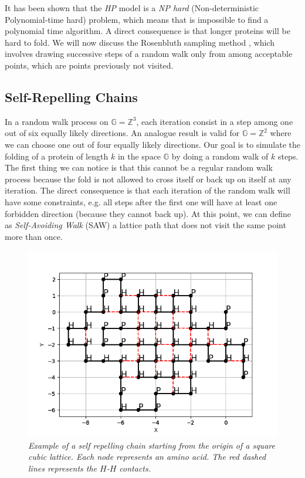 It has been shown that the \emph{HP} model is a \emph{NP hard} (Non-deterministic Polynomial-time hard) problem, which means that is impossible to find a polynomial time algorithm.
A direct consequence is that longer proteins will be hard to fold.
We will now discuss the Rosenbluth sampling method \cite{PERM}, which involves drawing successive steps of a random walk only from among acceptable points, which are points previously not visited.

\subsection{Self-Repelling Chains}
In a random walk process on $\mathbb{G} = \mathbb{Z}^3$, each iteration consist in a step among one out of six equally likely directions.
An analogue result is valid for $\mathbb{G} = \mathbb{Z}^2$ where we can choose one out of four equally likely directions.
Our goal is to simulate the folding of a protein of length $k$ in the space $\mathbb{G}$ by doing a random walk of $k$ steps.
The first thing we can notice is that this cannot be a regular random walk process because the fold is not allowed to cross itself or back up on itself at any iteration.
The direct consequence is that each iteration of the random walk will have some constraints, e.g. all steps after the first one will have at least one forbidden direction (because they cannot back up).
At this point, we can define as \emph{Self-Avoiding Walk} (SAW) a lattice path that does not visit the same point more than once.
\begin{figure}[H]
    \centering
    \includegraphics[width=.75\textwidth]{./img/src_example.png}
    \caption{\emph{Example of a self repelling chain starting from the origin of a square cubic lattice.
                    Each node represents an amino acid.
                    The red dashed lines represents the $H$-$H$ contacts.}}
    \label{fig:src_example}
\end{figure}
